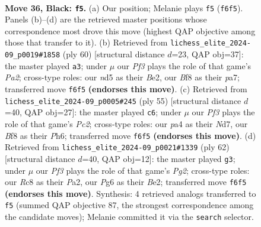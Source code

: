 \documentclass[11pt]{article}
\begin{document}
\clearpage

\begin{figure}[p]\centering
\begin{subfigure}{0.46\textwidth}\centering
\resizebox{\linewidth}{!}{%
\newchessgame
\chessboard[
  setfen={2r2b2/pp5k/5pp1/3N3p/P7/6P1/RPP2PKP/4r3 b - - 4 36},
  showmover=false,
  pgfstyle=straightmove, color=movearrow, markmove={f6-f5}
]}
\caption{}
\end{subfigure}\hfill
\begin{subfigure}{0.46\textwidth}\centering
\resizebox{\linewidth}{!}{%
\newchessgame
\chessboard[
  setfen={3R4/p4pkp/6p1/2r5/1np2P2/8/PP2B1PP/1K6 w - - 1 31},
  showmover=false,
  pgfstyle=straightmove, color=movearrow, markmove={a2-a3}
]}
\caption{}
\end{subfigure}
\\[4pt]
\begin{subfigure}{0.46\textwidth}\centering
\resizebox{\linewidth}{!}{%
\newchessgame
\chessboard[
  setfen={r4k2/1ppn1pp1/7p/1N1P4/2P1R3/7P/P4PP1/5K2 b - - 2 28},
  showmover=false,
  pgfstyle=straightmove, color=movearrow, markmove={c7-c6}
]}
\caption{}
\end{subfigure}\hfill
\begin{subfigure}{0.46\textwidth}\centering
\resizebox{\linewidth}{!}{%
\newchessgame
\chessboard[
  setfen={r7/1p2kppp/p1b1p3/8/2P2P2/8/PP1RBKPP/8 w - - 3 32},
  showmover=false,
  pgfstyle=straightmove, color=movearrow, markmove={g2-g3}
]}
\caption{}
\end{subfigure}
\caption{\textbf{Move 36, Black: \texttt{f5}.} (a) Our position; Melanie plays \texttt{f5} (\texttt{f6f5}). Panels (b)--(d) are the retrieved master positions whose correspondence most drove this move (highest QAP objective among those that transfer to it). (b) Retrieved from \texttt{lichess\_elite\_2024-09\_p0019\#1858} (ply 60) [structural distance $d$=23, QAP obj=37]: the master played \texttt{a3}; under $\mu$ our \emph{Pf3} plays the role of that game's \emph{Pa2}; cross-type roles: our \emph{n}d5 as their \emph{B}e2, our \emph{B}f8 as their \emph{p}a7; transferred move \texttt{f6f5} \textbf{(endorses this move)}. (c) Retrieved from \texttt{lichess\_elite\_2024-09\_p0005\#245} (ply 55) [structural distance $d$=40, QAP obj=27]: the master played \texttt{c6}; under $\mu$ our \emph{Pf3} plays the role of that game's \emph{Pc2}; cross-type roles: our \emph{p}a4 as their \emph{N}d7, our \emph{B}f8 as their \emph{P}h6; transferred move \texttt{f6f5} \textbf{(endorses this move)}. (d) Retrieved from \texttt{lichess\_elite\_2024-09\_p0021\#1339} (ply 62) [structural distance $d$=40, QAP obj=12]: the master played \texttt{g3}; under $\mu$ our \emph{Pf3} plays the role of that game's \emph{Pg2}; cross-type roles: our \emph{R}c8 as their \emph{P}a2, our \emph{P}g6 as their \emph{B}e2; transferred move \texttt{f6f5} \textbf{(endorses this move)}. Synthesis: 4 retrieved analogs transferred to \texttt{f5} (summed QAP objective 87, the strongest correspondence among the candidate moves); Melanie committed it via the \texttt{search} selector.}
\label{fig:thought-m71}
\end{figure}
\end{document}
